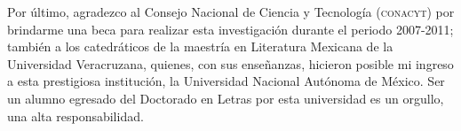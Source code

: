 \documentclass[14pt,twoside,final]{extbook} %
\begin{document}
Por último, agradezco al Consejo Nacional de Ciencia y Tecnología (\textsc{conacyt}) por brindarme una beca para realizar esta investigación durante el periodo 2007-2011; también a los catedráticos de la maestría en Literatura Mexicana de la Universidad Veracruzana, quienes, con sus enseñanzas, hicieron posible mi ingreso a esta prestigiosa institución, la Universidad Nacional Autónoma de México. Ser un alumno egresado del Doctorado en Letras por esta universidad es un orgullo, una alta responsabilidad.
\clearpage
\makeatletter
\renewcommand\@dotsep{200} %
\makeatother
\renewcommand{\contentsname}{Índice}
\thispagestyle{empty}
\pagestyle{fancy}
\fancyhf{} %
\fancyhead[RO,LE]{\thepage}
\fancyfoot{}
\renewcommand{\headrulewidth}{0pt}
\protect{}
{}
\tableofcontents
{}
\newpage
\pagestyle{empty}
\null\vfill
\newpage
\pagestyle{empty}
\hspace*{0pt}
\vfill
\end{document}
